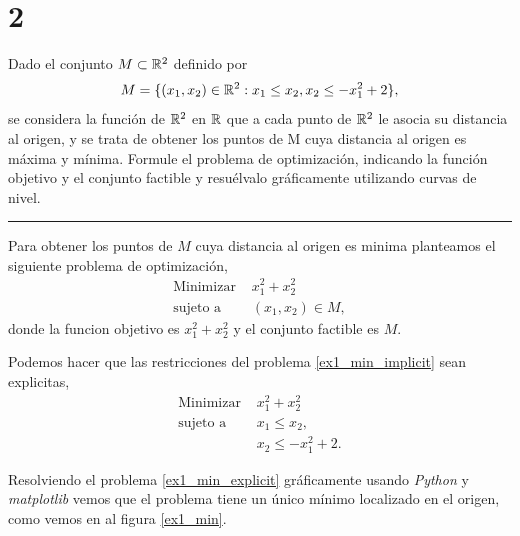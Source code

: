 \section*{2}

Dado el conjunto $M \subset \mathbb{R}^2$ definido por
\begin{equation*}
    M = \{(x_1 , x_2 ) \in \mathbb{R}^2 : x_1 \leq x_2 , x_2 \leq -x_1^2 + 2\},
\end{equation*}
se considera la función de $\mathbb{R}^2$ en $\mathbb{R}$ que a cada punto de $\mathbb{R}^2$ le asocia su distancia al origen,
y se trata de obtener los puntos de M cuya distancia al origen es máxima y mínima.
Formule el problema de optimización, indicando la función objetivo y el conjunto factible y resuélvalo gráficamente utilizando curvas de nivel.

\noindent\rule{10cm}{0.4pt}

Para obtener los puntos de $M$ cuya distancia al origen es minima planteamos el siguiente problema de optimización,
\begin{equation} \label{ex1_min_implicit}
\begin{aligned}
    \text{Minimizar }   & x_1^2 + x_2^2 \\
    \text{sujeto a }    & (x_1, x_2) \in M,
\end{aligned}
\end{equation}
donde la funcion objetivo es $x_1^2 + x_2^2$ y el conjunto factible es $M$.

Podemos hacer que las restricciones del problema \ref{ex1_min_implicit} sean explicitas,
\begin{equation} \label{ex1_min_explicit}
\begin{aligned}
    \text{Minimizar }   & x_1^2 + x_2^2 \\
    \text{sujeto a }    & x_1 \leq x_2, \\
                        & x_2 \leq -x_1^2 + 2.
\end{aligned}
\end{equation}

Resolviendo el problema \ref{ex1_min_explicit} gráficamente usando \textit{Python} y \textit{matplotlib}
vemos que el problema tiene un único mínimo localizado en el origen, como vemos en al figura \ref{ex1_min}.


